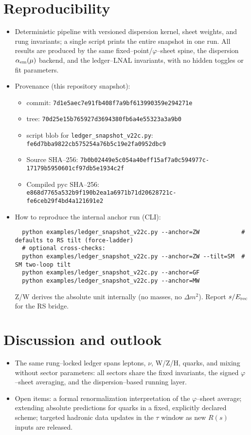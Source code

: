 \documentclass[11pt]{article}
\begin{document}
\section{Reproducibility}
\begin{itemize}
  \item Deterministic pipeline with versioned dispersion kernel, sheet weights, and rung invariants; a single script prints the entire snapshot in one run. All results are produced by the same fixed–point/$\varphi$–sheet spine, the dispersion $\alpha_{\rm em}(\mu)$ backend, and the ledger–LNAL invariants, with no hidden toggles or fit parameters.
  \item Provenance (this repository snapshot): 
    \begin{itemize}
      \item commit: \texttt{7d1e5aec7e91fb408f7a9bf613990359e294271e}
      \item tree: \texttt{70d25e15b765927d3694380fb6a4e55323a3a9b0}
      \item script blob for \texttt{ledger\_snapshot\_v22c.py}: \texttt{fe6d7bba9822cb575254a76b5c19e2fa0952dbc9}
      \item Source SHA--256: \texttt{7b0b02449e5c054a40eff15af7a0c594977c-}\\\texttt{17179b5950601cf97db5e1934c2f}
      \item Compiled pyc SHA--256: \texttt{e868d7765a532b9f190b2ea1a6971b71d20628721c-}\\\texttt{fe6ceb29f4bd4a121691e2}
    \end{itemize}
  \item How to reproduce the internal anchor run (CLI):
  \begin{verbatim}
  python examples/ledger_snapshot_v22c.py --anchor=ZW            # defaults to RS tilt (force-ladder)
  # optional cross-checks:
  python examples/ledger_snapshot_v22c.py --anchor=ZW --tilt=SM  # SM two-loop tilt
  python examples/ledger_snapshot_v22c.py --anchor=GF
  python examples/ledger_snapshot_v22c.py --anchor=MW
  \end{verbatim}
  Z/W derives the absolute unit internally (no masses, no $\Delta m^2$). Report $s/E_{\rm rec}$ for the RS bridge.
\end{itemize}

\section{Discussion and outlook}
\begin{itemize}
  \item The same rung–locked ledger spans leptons, $\nu$, W/Z/H, quarks, and mixing without sector parameters: all sectors share the fixed invariants, the signed $\varphi$–sheet averaging, and the dispersion–based running layer.
  \item Open items: a formal renormalization interpretation of the $\varphi$–sheet average; extending absolute predictions for quarks in a fixed, explicitly declared scheme; targeted hadronic data updates in the $\tau$ window as new $R(s)$ inputs are released.
\end{itemize}
\end{document}
